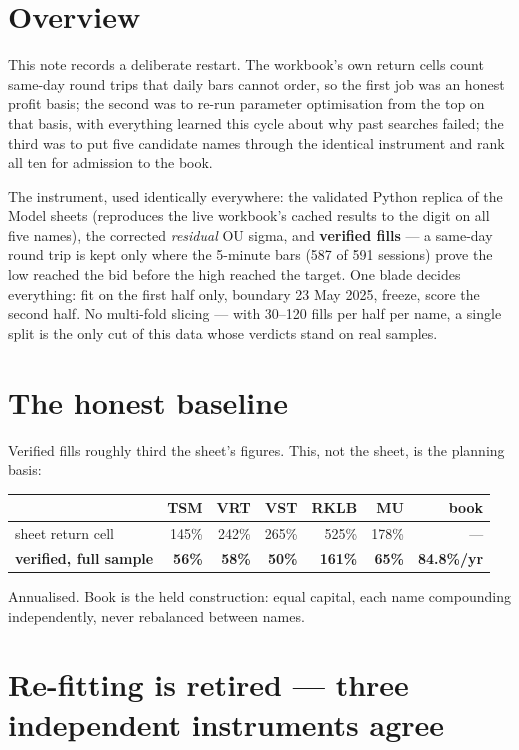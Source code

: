 \documentclass[11pt,a4paper]{article}
\newcommand{\tabnote}[1]{\begin{center}\begin{minipage}{0.92\textwidth}
  \footnotesize\color{bcgrey}#1\end{minipage}\end{center}}
\begin{document}
\section{Overview}

This note records a deliberate restart. The workbook's own return cells count
same-day round trips that daily bars cannot order, so the first job was an honest
profit basis; the second was to re-run parameter optimisation from the top on that
basis, with everything learned this cycle about why past searches failed; the third
was to put five candidate names through the identical instrument and rank all ten
for admission to the book.

The instrument, used identically everywhere: the validated Python replica of the
Model sheets (reproduces the live workbook's cached results to the digit on all
five names), the corrected \emph{residual} OU sigma, and \textbf{verified fills} ---
a same-day round trip is kept only where the 5-minute bars (587 of 591 sessions)
prove the low reached the bid before the high reached the target. One blade
decides everything: fit on the first half only, boundary 23 May 2025, freeze, score
the second half. No multi-fold slicing --- with 30--120 fills per half per name, a
single split is the only cut of this data whose verdicts stand on real samples.

\section{The honest baseline}

Verified fills roughly third the sheet's figures. This, not the sheet, is the
planning basis:

\begin{center}
\begin{tabular}{lrrrrr|r}
\toprule
 & TSM & VRT & VST & RKLB & MU & book \\
\midrule
sheet return cell   & 145\% & 242\% & 265\% & 525\% & 178\% & --- \\
\textbf{verified, full sample} & \textbf{56\%} & \textbf{58\%} & \textbf{50\%}
  & \textbf{161\%} & \textbf{65\%} & \textbf{84.8\%/yr} \\
\bottomrule
\end{tabular}
\end{center}

\tabnote{Annualised. Book is the held construction: equal capital, each name
compounding independently, never rebalanced between names.}

\section{Re-fitting is retired --- three independent instruments agree}
\end{document}

